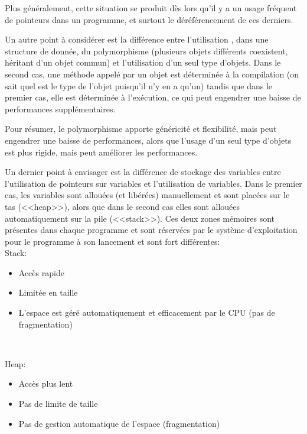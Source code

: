 \documentclass[a4paper,french,12pt]{article}
\begin{document}
	      Plus généralement, cette situation se produit dès lors qu'il y a un usage fréquent de pointeurs dans un 
	      programme, et surtout le déréférencement de ces derniers.
	      
	      Un autre point à considérer est la différence entre l'utilisation , dans une structure de donnée, du polymorphisme (plusieurs objets
	      différents coexistent, héritant d'un objet commun) et l'utilisation d'un seul type d'objets.
	      Dans le second cas, une méthode appelé par un objet est déterminée à la compilation (on sait quel est le type
	      de l'objet puisqu'il n'y en a qu'un) tandis que dans le premier cas, elle est déterminée à l'exécution,
	      ce qui peut engendrer une baisse de performances supplémentaires.
	      
	      Pour résumer, le polymorphisme apporte généricité et flexibilité, mais peut engendrer une baisse de 
	      performances, alors que l'usage d'un seul type d'objets est plus rigide, mais peut améliorer les performances.
	      
	      Un dernier point à envisager est la différence de stockage des variables entre l'utilisation de pointeurs sur variables
	      et l'utilisation de variables. Dans le premier cas, les variables sont allouées (et libérées) manuellement et sont placées sur
	      le tas (<<heap>>), alors que dans le second cas elles sont allouées automatiquement sur la pile (<<stack>>).
	      Ces deux zones mémoires sont présentes dans chaque programme et sont réservées par le système d'exploitation
	      pour le programme à son lancement et sont fort différentes:\\
	      
	      Stack:
	      \begin{itemize}
		\item Accès rapide
		\item Limitée en taille
		\item L'espace est géré automatiquement et efficacement par le CPU (pas de fragmentation)
	      \end{itemize}~
	      
	      Heap:
	      \begin{itemize}
		\item Accès plus lent
		\item Pas de limite de taille
		\item Pas de gestion automatique de l'espace (fragmentation)
	      \end{itemize}~
	      
\end{document}

